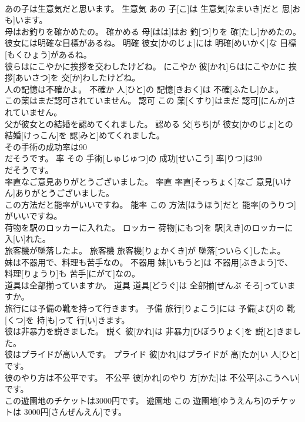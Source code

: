\documentclass[8pt]{extreport}
\begin{document}
\begin{CJK}{UTF8}{min}
\\	あの子は生意気だと思います。	生意気	あの 子[こ]は 生意気[なまいき]だと 思[おも]います。	
\\	母はお釣りを確かめたの。	確かめる	母[はは]はお 釣[つ]りを 確[たし]かめたの。	
\\	彼女には明確な目標があるね。	明確	彼女[かのじょ]には 明確[めいかく]な 目標[もくひょう]があるね。	
\\	彼らはにこやかに挨拶を交わしたけどね。	にこやか	彼[かれ]らはにこやかに 挨拶[あいさつ]を 交[か]わしたけどね。	
\\	人の記憶は不確かよ。	不確か	人[ひと]の 記憶[きおく]は 不確[ふたし]かよ。	
\\	この薬はまだ認可されていません。	認可	この 薬[くすり]はまだ 認可[にんか]されていません。	
\\	父が彼女との結婚を認めてくれました。	認める	父[ちち]が 彼女[かのじょ]との 結婚[けっこん]を 認[みと]めてくれました。	
\\	その手術の成功率は90
\\	だそうです。	率	その 手術[しゅじゅつ]の 成功[せいこう] 率[りつ]は90
\\	だそうです。	
\\	率直なご意見ありがとうございました。	率直	率直[そっちょく]なご 意見[いけん]ありがとうございました。	
\\	この方法だと能率がいいですね。	能率	この 方法[ほうほう]だと 能率[のうりつ]がいいですね。	
\\	荷物を駅のロッカーに入れた。	ロッカー	荷物[にもつ]を 駅[えき]のロッカーに 入[い]れた。	
\\	旅客機が墜落したよ。	旅客機	旅客機[りょかくき]が 墜落[ついらく]したよ。	
\\	妹は不器用で、料理も苦手なの。	不器用	妹[いもうと]は 不器用[ぶきよう]で、 料理[りょうり]も 苦手[にがて]なの。	
\\	道具は全部揃っていますか。	道具	道具[どうぐ]は 全部揃[ぜんぶ そろ]っていますか。	
\\	旅行には予備の靴を持って行きます。	予備	旅行[りょこう]には 予備[よび]の 靴[くつ]を 持[も]って 行[い]きます。	
\\	彼は非暴力を説きました。	説く	彼[かれ]は 非暴力[ひぼうりょく]を 説[と]きました。	
\\	彼はプライドが高い人です。	プライド	彼[かれ]はプライドが 高[たか]い 人[ひと]です。	
\\	彼のやり方は不公平です。	不公平	彼[かれ]のやり 方[かた]は 不公平[ふこうへい]です。	
\\	この遊園地のチケットは3000円です。	遊園地	この 遊園地[ゆうえんち]のチケットは 3000円[さんぜんえん]です。	

\end{CJK}
\end{document}
